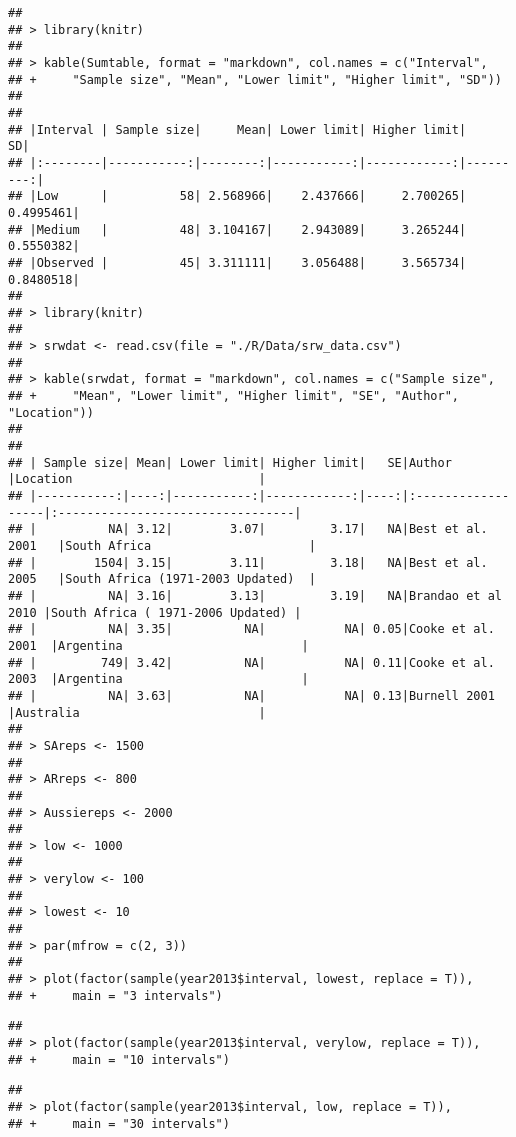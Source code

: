 \documentclass[]{book}
\begin{document}
\begin{verbatim}
## 
## > library(knitr)
## 
## > kable(Sumtable, format = "markdown", col.names = c("Interval", 
## +     "Sample size", "Mean", "Lower limit", "Higher limit", "SD"))
## 
## 
## |Interval | Sample size|     Mean| Lower limit| Higher limit|        SD|
## |:--------|-----------:|--------:|-----------:|------------:|---------:|
## |Low      |          58| 2.568966|    2.437666|     2.700265| 0.4995461|
## |Medium   |          48| 3.104167|    2.943089|     3.265244| 0.5550382|
## |Observed |          45| 3.311111|    3.056488|     3.565734| 0.8480518|
## 
## > library(knitr)
## 
## > srwdat <- read.csv(file = "./R/Data/srw_data.csv")
## 
## > kable(srwdat, format = "markdown", col.names = c("Sample size", 
## +     "Mean", "Lower limit", "Higher limit", "SE", "Author", "Location"))
## 
## 
## | Sample size| Mean| Lower limit| Higher limit|   SE|Author             |Location                          |
## |-----------:|----:|-----------:|------------:|----:|:------------------|:---------------------------------|
## |          NA| 3.12|        3.07|         3.17|   NA|Best et al. 2001   |South Africa                      |
## |        1504| 3.15|        3.11|         3.18|   NA|Best et al. 2005   |South Africa (1971-2003 Updated)  |
## |          NA| 3.16|        3.13|         3.19|   NA|Brandao et al 2010 |South Africa ( 1971-2006 Updated) |
## |          NA| 3.35|          NA|           NA| 0.05|Cooke et al. 2001  |Argentina                         |
## |         749| 3.42|          NA|           NA| 0.11|Cooke et al. 2003  |Argentina                         |
## |          NA| 3.63|          NA|           NA| 0.13|Burnell 2001       |Australia                         |
## 
## > SAreps <- 1500
## 
## > ARreps <- 800
## 
## > Aussiereps <- 2000
## 
## > low <- 1000
## 
## > verylow <- 100
## 
## > lowest <- 10
## 
## > par(mfrow = c(2, 3))
## 
## > plot(factor(sample(year2013$interval, lowest, replace = T)), 
## +     main = "3 intervals")
\end{verbatim}

\begin{verbatim}
## 
## > plot(factor(sample(year2013$interval, verylow, replace = T)), 
## +     main = "10 intervals")
\end{verbatim}

\begin{verbatim}
## 
## > plot(factor(sample(year2013$interval, low, replace = T)), 
## +     main = "30 intervals")
\end{verbatim}
\end{document}
